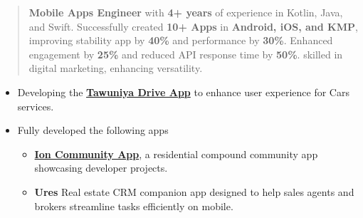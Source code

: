 \documentclass[10pt,a4paper,ragged2e,withhyper]{altacv}
\begin{document}

\makecvheader




\begin{quote}

\textbf{Mobile Apps Engineer} with \textbf{4+ years} of experience in Kotlin, Java, and Swift.
Successfully created \textbf{10+ Apps} in \textbf{Android, iOS, and KMP}, improving stability app by \textbf{40\%} and performance by \textbf{30\%}.
Enhanced engagement by \textbf{25\%} and reduced API response time by \textbf{50\%}.
skilled in digital marketing, enhancing versatility.



\end{quote}




\begin{itemize}
\item Developing the \href{https://play.google.com/store/apps/details?id=za.co.vitalitydrive.tawuniya}{\textbf{Tawuniya Drive App}} to enhance user experience for Cars services.
\end{itemize}
\divider

\begin{itemize}
\item Fully developed the following apps
\begin{itemize}
\item \hyperlink{ion}{\textbf{Ion Community App}}, a residential compound community app showcasing developer projects.
\item \textbf{Ures }Real estate CRM companion app designed to help sales agents and brokers streamline tasks efficiently on mobile.
\end{itemize}
\end{itemize}
\divider
\end{document}
